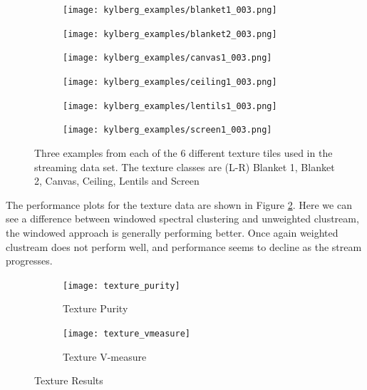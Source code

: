 \begin{figure}[h!]
\begin{subfigure}{.15\textwidth}
  \centering
  \texttt{[image: kylberg\_examples/blanket1\_003.png]}
\end{subfigure}%
\begin{subfigure}{.15\textwidth}
  \centering
  \texttt{[image: kylberg\_examples/blanket2\_003.png]}
\end{subfigure}
\begin{subfigure}{.15\textwidth}
  \centering
  \texttt{[image: kylberg\_examples/canvas1\_003.png]}
\end{subfigure}
\begin{subfigure}{.15\textwidth}
  \centering
  \texttt{[image: kylberg\_examples/ceiling1\_003.png]}
\end{subfigure}%
\begin{subfigure}{.15\textwidth}
  \centering
  \texttt{[image: kylberg\_examples/lentils1\_003.png]}
\end{subfigure}
\begin{subfigure}{.15\textwidth}
  \centering
  \texttt{[image: kylberg\_examples/screen1\_003.png]}
\end{subfigure}
\caption{Three examples from each of the 6 different texture tiles used in the streaming data set. The texture classes are (L-R) Blanket 1, Blanket 2, Canvas, Ceiling, Lentils and Screen}
\label{fig:texture_examples}
\end{figure}

The performance plots for the texture data are shown in Figure \ref{fig:texture_results}. Here we can see a difference between windowed spectral clustering and unweighted clustream, the windowed approach is generally performing better. Once again weighted clustream does not perform well, and performance seems to decline as the stream progresses.

\begin{figure}[h!]
\begin{subfigure}{.5\textwidth}
  \centering
  \texttt{[image: texture\_purity]}
  \caption{Texture Purity}
\end{subfigure}%
\begin{subfigure}{.5\textwidth}
  \centering
  \texttt{[image: texture\_vmeasure]}
  \caption{Texture V-measure}
\end{subfigure}
\caption{Texture Results}
\label{fig:texture_results}
\end{figure}

